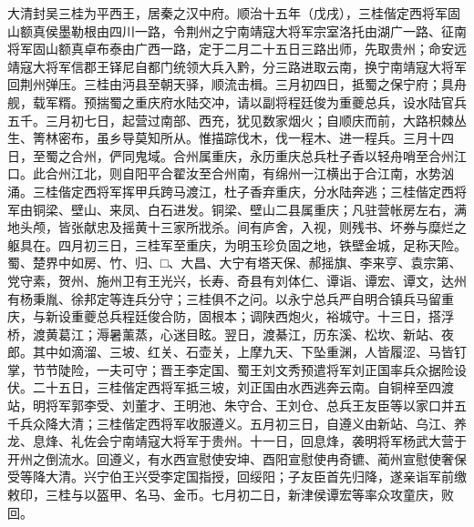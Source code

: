 \documentclass[]{article}
\begin{document}
大清封吴三桂为平西王，居秦之汉中府。顺治十五年（戊戌），三桂偕定西将军固山额真侯墨勒根由四川一路，令荆州之宁南靖寇大将军宗室洛托由湖广一路、征南将军固山额真卓布泰由广西一路，定于二月二十五日三路出师，先取贵州；命安远靖寇大将军信郡王铎尼自都门统领大兵入黔，分三路进取云南，换宁南靖寇大将军回荆州弹压。三桂由沔县至朝天驿，顺流击楫。三月初四日，抵蜀之保宁府；具舟舰，载军糈。预揣蜀之重庆府水陆交冲，请以副将程廷俊为重夔总兵，设水陆官兵五千。三月初七日，起营过南部、西充，犹见数家烟火；自顺庆而前，大路枳棘丛生、箐林密布，虽乡导莫知所从。惟描踪伐木，伐一程木、进一程兵。三月十四日，至蜀之合州，俨同鬼域。合州属重庆，永历重庆总兵杜子香以轻舟哨至合州江口。此合州江北，则自阳平合翟汝至合州南，有绵州一江横出于合江南，水势汹涌。三桂偕定西将军挥甲兵跨马渡江，杜子香弃重庆，分水陆奔逃；三桂偕定西将军由铜梁、壁山、来凤、白石进发。铜梁、壁山二县属重庆；凡驻营帐房左右，满地头颅，皆张献忠及摇黄十三家所戕杀。间有庐舍，入视，则残书、坏券与糜烂之躯具在。四月初三日，三桂军至重庆，为明玉珍负固之地，铁壁金城，足称天险。蜀、楚界中如房、竹、归、□、大昌、大宁有塔天保、郝摇旗、李来亨、袁宗第、党守素，贺州、施州卫有王光兴，长寿、奇县有刘体仁、谭诣、谭宏、谭文，达州有杨秉胤、徐邦定等连兵分守；三桂俱不之问。以永宁总兵严自明合镇兵马留重庆，与新设重夔总兵程廷俊合防，固根本；调陕西炮火，裕城守。十三日，搭浮桥，渡黄葛江；溽暑薰蒸，心迷目眩。翌日，渡綦江，历东溪、松坎、新站、夜郎。其中如滴溜、三坡、红关、石壶关，上摩九天、下坠重渊，人皆履涩、马皆钉掌，节节陡险，一夫可守；晋王李定国、蜀王刘文秀预遣将军刘正国率兵众据险设伏。二十五日，三桂偕定西将军抵三坡，刘正国由水西逃奔云南。自铜梓至四渡站，明将军郭李受、刘董才、王明池、朱守合、王刘仓、总兵王友臣等以家口并五千兵众降大清；三桂偕定西将军收服遵义。五月初三日，自遵义由新站、乌江、养龙、息烽、礼佐会宁南靖寇大将军于贵州。十一日，回息烽，袭明将军杨武大营于开州之倒流水。回遵义，有水西宣慰使安坤、酉阳宣慰使冉奇镳、蔺州宣慰使奢保受等降大清。兴宁伯王兴受李定国指授，回绥阳；子友臣首先归降，遂亲诣军前缴敕印，三桂与以盔甲、名马、金币。七月初二日，新津侯谭宏等率众攻童庆，败回。
\end{document}
